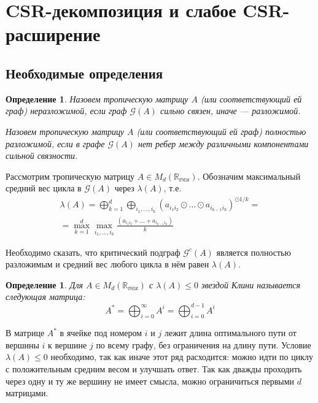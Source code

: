 \documentclass[12pt]{article}
\newtheorem{definition}[theorem]{Определение}
\begin{document}
\section{CSR-декомпозиция и слабое CSR-расширение}
\subsection{Необходимые определения}
\begin{definition}
Назовем тропическую матрицу $A$ (или соответствующий ей граф) неразложимой, если граф $\mathcal{G}(A)$ сильно связен, иначе --- разложимой.

Назовем тропическую матрицу $A$ (или соответствующий ей граф) полностью разложимой, если в графе $\mathcal{G}(A)$ нет ребер между различными компонентами сильной связности.
\end{definition}

Рассмотрим тропическую матрицу $A \in M_d(\mathbb{R_{\max}})$. Обозначим максимальный средний вес цикла в $\mathcal{G}(A)$ через $\lambda(A)$, т.е.
\begin{equation}
    \begin{split}
        \lambda(A) = \bigoplus_{k = 1}^d \bigoplus_{i_1, \dots, i_k} (a_{{i_1}{i_2}}\odot \dots \odot a_{{i_{k - 1}}{i_k}})^{\odot{1/k}} =\\
        =\max_{k = 1}^d \max_{i_1, \dots, i_k} \frac{(a_{{i_1}{i_2}} + \dots + a_{{i_{k - 1}}{i_k}})}{k}
    \end{split}
\end{equation}

Необходимо сказать, что критический подграф $\mathcal{G}^c(A)$ является полностью разложимым и средний вес любого цикла в нём равен $\lambda(A)$.
\begin{definition}
Для $A \in M_d(\mathbb{R_{\max}})$ с $\lambda(A) \le 0$ звездой Клини называется следующая матрица:
\begin{equation*}
    A^* = \bigoplus_{i = 0}^{\infty} A^i =  \bigoplus_{i = 0}^{d - 1} A^i
\end{equation*}
\end{definition}

В матрице $A^*$ в ячейке под номером $i$ и $j$ лежит длина оптимального пути от вершины $i$ к вершине $j$ по всему графу, без ограничения на длину пути. Условие $\lambda(A) \le 0$ необходимо, так как иначе этот ряд расходится: можно идти по циклу с положительным средним весом и улучшать ответ. Так как дважды проходить через одну и ту же вершину не имеет смысла, можно ограничиться первыми $d$ матрицами.
\end{document}
